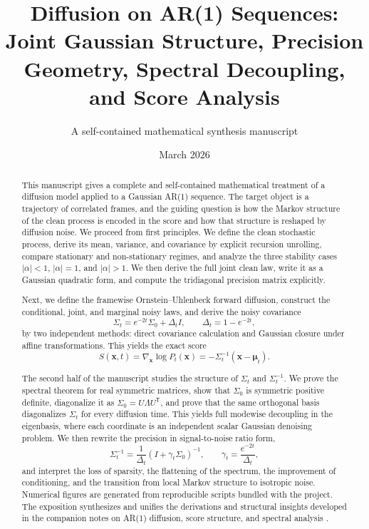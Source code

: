 \documentclass[11pt]{article}
\title{\textbf{Diffusion on AR(1) Sequences:}\\
Joint Gaussian Structure, Precision Geometry, Spectral Decoupling, and Score Analysis}
\author{A self-contained mathematical synthesis manuscript}
\date{March 2026}
\numberwithin{equation}{section}
\theoremstyle{definition}
\theoremstyle{remark}
\newcommand{\Id}{I}
\newcommand{\trans}{\mathsf{T}}
\begin{document}
\maketitle
\thispagestyle{empty}

\begin{abstract}
This manuscript gives a complete and self-contained mathematical treatment of a diffusion model applied to a Gaussian AR(1) sequence. The target object is a trajectory of correlated frames, and the guiding question is how the Markov structure of the clean process is encoded in the score and how that structure is reshaped by diffusion noise. We proceed from first principles. We define the clean stochastic process, derive its mean, variance, and covariance by explicit recursion unrolling, compare stationary and non-stationary regimes, and analyze the three stability cases $|\alpha|<1$, $|\alpha|=1$, and $|\alpha|>1$. We then derive the full joint clean law, write it as a Gaussian quadratic form, and compute the tridiagonal precision matrix explicitly.

Next, we define the framewise Ornstein--Uhlenbeck forward diffusion, construct the conditional, joint, and marginal noisy laws, and derive the noisy covariance
\[
\Sigma_t = e^{-2t}\Sigma_0 + \Delta_t \Id,
\qquad
\Delta_t = 1-e^{-2t},
\]
by two independent methods: direct covariance calculation and Gaussian closure under affine transformations. This yields the exact score
\[
S(\mathbf{x},t)=\nabla_{\mathbf{x}}\log P_t(\mathbf{x})=-\Sigma_t^{-1}(\mathbf{x}-\boldsymbol{\mu}_t).
\]

The second half of the manuscript studies the structure of $\Sigma_t$ and $\Sigma_t^{-1}$. We prove the spectral theorem for real symmetric matrices, show that $\Sigma_0$ is symmetric positive definite, diagonalize it as $\Sigma_0=U\Lambda U^\trans$, and prove that the same orthogonal basis diagonalizes $\Sigma_t$ for every diffusion time. This yields full modewise decoupling in the eigenbasis, where each coordinate is an independent scalar Gaussian denoising problem. We then rewrite the precision in signal-to-noise ratio form,
\[
\Sigma_t^{-1} = \frac{1}{\Delta_t}(\Id+\gamma_t\Sigma_0)^{-1},
\qquad
\gamma_t = \frac{e^{-2t}}{\Delta_t},
\]
and interpret the loss of sparsity, the flattening of the spectrum, the improvement of conditioning, and the transition from local Markov structure to isotropic noise. Numerical figures are generated from reproducible scripts bundled with the project. The exposition synthesizes and unifies the derivations and structural insights developed in the companion notes on AR(1) diffusion, score structure, and spectral analysis \cite{draftar1,structure,anatomy,companion,mezardnotes,biroli2023}.
\end{abstract}
\end{document}
